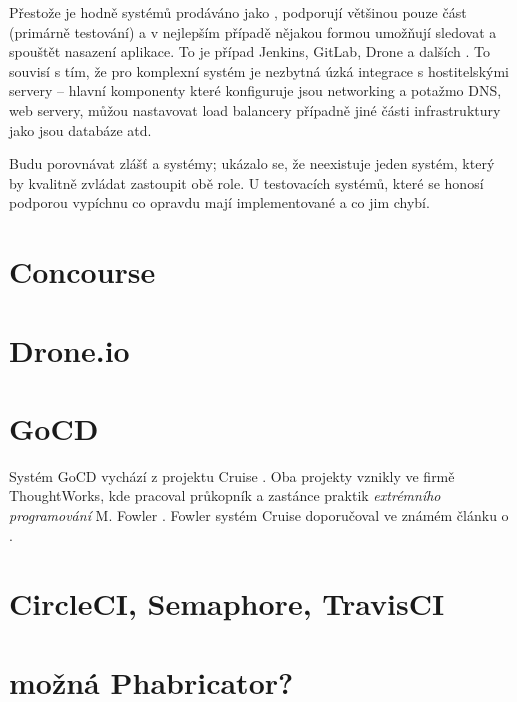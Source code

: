     Přestože je hodně systémů prodáváno jako \CICD, podporují většinou pouze \CI část (primárně testování) a v nejlepším případě nějakou formou umožňují sledovat a spouštět nasazení aplikace. To je případ Jenkins, GitLab, Drone a dalších \cite{ellingwood-cicd-list}. To souvisí s tím, že pro komplexní \CD systém je nezbytná úzká integrace s hostitelskými servery -- hlavní komponenty které \CD konfiguruje jsou networking a potažmo DNS, \HTTP web servery, můžou nastavovat load balancery případně jiné části infrastruktury jako jsou databáze atd.

    Budu porovnávat zlášť \CI a \CD systémy; ukázalo se, že neexistuje jeden systém, který by kvalitně zvládat zastoupit obě role. U testovacích systémů, které se honosí podporou \CD vypíchnu co opravdu mají implementované a co jim chybí.

    

    

    

    \section{Concourse}
    \section{Drone.io}

    \section{GoCD}
        Systém GoCD vychází z projektu Cruise \cite{thoughtworks-gocd}. Oba projekty vznikly ve firmě ThoughtWorks, kde pracoval průkopník a zastánce praktik \textit{extrémního programování} M. Fowler \cite{fowler-go}. Fowler systém Cruise doporučoval ve známém článku o \CI \cite{fowler-ci}.

    \section{CircleCI, Semaphore, TravisCI}

    \section{možná Phabricator?}

